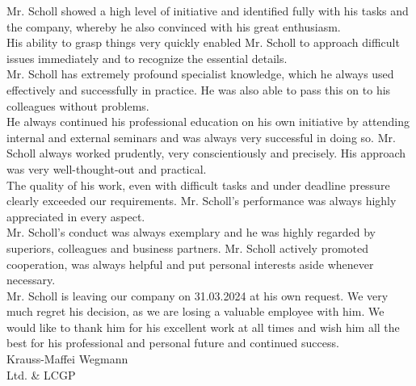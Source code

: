 \documentclass[10pt, 4paper]{article}
\begin{document}
\begin{Parallel}{0.73\textwidth}{0.23\textwidth}
{{            Mr. Scholl showed a high level of initiative and identified fully with his tasks and the company, whereby he also convinced with his great enthusiasm.\\%

            His ability to grasp things very quickly enabled Mr. Scholl to approach difficult issues immediately and to recognize the essential details.\\%

            Mr. Scholl has extremely profound specialist knowledge, which he always used effectively and successfully in practice. He was also able to pass this on to his colleagues without problems.\\%

            He always continued his professional education on his own initiative by attending internal and external seminars and was always very successful in doing so. Mr. Scholl always worked prudently, very conscientiously and precisely. His approach was very well-thought-out and practical.\\%

            The quality of his work, even with difficult tasks and under deadline pressure clearly exceeded our requirements. Mr. Scholl's performance was always highly appreciated in every aspect.\\%

            Mr. Scholl's conduct was always exemplary and he was highly regarded by superiors, colleagues and business partners. Mr. Scholl actively promoted cooperation, was always helpful and put personal interests aside whenever necessary.\\%

            Mr. Scholl is leaving our company on 31.03.2024 at his own request. We very much regret his decision, as we are losing a valuable employee with him. We would like to thank him for his excellent work at all times and wish him all the best for his professional and personal future and continued success.\\[.7cm]%

            Krauss-Maffei Wegmann\\%
            Ltd. \& LCGP\\%

}}
\end{Parallel}
\end{document}
